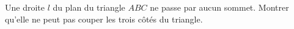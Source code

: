 Une droite $l$ du plan du triangle $ABC$ ne passe par aucun sommet. Montrer qu'elle ne peut pas couper les trois côtés du triangle.
